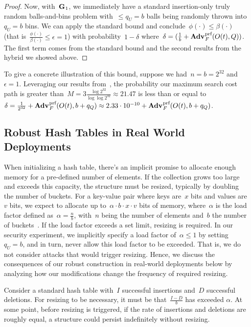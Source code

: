 \begin{proof}
    Now, with~$\textup{\textbf{G}}\hspace{0.5pt}_1$, we immediately have a standard insertion-only truly random balls-and-bins problem with~$\leq q_U = b$ balls being randomly thrown into~$q_U = b$ bins. We can apply the standard bound and conclude~$\phi(\cdot) \leq \beta (\cdot)$ (that is~$\frac{\phi(\cdot)}{\beta (\cdot)} \leq \epsilon = 1$) with probability~$1-\delta$ where~$\delta = (\frac{1}{b} + \Adv{\text{prf}}_{F}(O(t),Q))$. The first term comes from the standard bound and the second results from the hybrid we showed above.
\end{proof} 

To give a concrete illustration of this bound, suppose we had~$n = b = 2^{32}$ and~$\epsilon = 1$. Leveraging our results from~, the probability our maximum search cost path is greater than~$M = 3 \frac{\log 2^{32}}{\log\log 2^{32}} \approx 21.47$ is less than or equal to $\delta = \frac{1}{2^{32}} + \Adv{\text{prf}}_{F}(O(t),b+q_Q) \approx 2.33 \cdot 10^{-10} + \Adv{\text{prf}}_{F}(O(t),b+q_Q)$.

\subsection{Robust Hash Tables in Real World Deployments}

When initializing a hash table, there's an implicit promise to allocate enough memory for a pre-defined number of elements. If the collection grows too large and exceeds this capacity, the structure must be resized, typically by doubling the number of buckets. For a key-value pair where keys are~$x$ bits and values are~$v$ bits, we expect to allocate up to~$\alpha \cdot b \cdot x \cdot v$ bits of memory, where~$\alpha$ is the load factor defined as~$\alpha = \frac{n}{b}$, with~$n$ being the number of elements and~$b$ the number of buckets~\cite{clrs}. If the load factor exceeds a set limit, resizing is required. In our security experiment, we implicitly specify a load factor of~$\alpha \leq 1$ by setting~$q_U = b$, and in turn, never allow this load factor to be exceeded. That is, we do not consider attacks that would trigger resizing. Hence, we discuss the consequences of our robust construction in real-world deployments below by analyzing how our modifications change the frequency of required resizing. 

Consider a standard hash table with~$I$ successful insertions and~$D$ successful deletions. For resizing to be necessary, it must be that~$\frac{I-D}{b}$ has exceeded $\alpha$. At some point, before resizing is triggered, if the rate of insertions and deletions are roughly equal, a structure could persist indefinitely without resizing.

